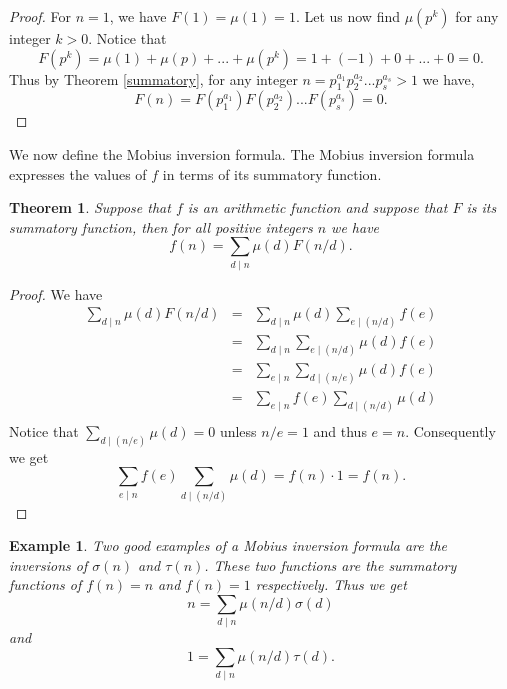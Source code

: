 \documentclass[12pt,letterpaper]{book}
\newtheorem{theorem}{Theorem}
\newtheorem{example}{Example}
\begin{document}
\begin{proof}
For $n=1$, we have $F(1)=\mu(1)=1$. Let us now find $\mu(p^k)$ for
any integer $k>0$.  Notice that
\begin{equation*}
F(p^k)=\mu(1)+\mu(p)+...+\mu(p^k)=1+(-1)+0+...+0=0.
\end{equation*}
Thus by Theorem \ref{summatory}, for any integer
$n=p_1^{a_1}p_2^{a_2}...p_s^{a_s}>1$ we have,
\begin{equation*}
F(n)=F(p_1^{a_1})F(p_2^{a_2})...F(p_s^{a_s})=0.
\end{equation*}
\end{proof}

We now define the Mobius inversion formula.  The Mobius inversion
formula expresses the values of $f$ in terms of its summatory
function. 
\begin{theorem}
Suppose that $f$ is an arithmetic function and suppose that $F$ is
its summatory function, then for all positive integers $n$ we have
\begin{equation*}
f(n)=\sum_{d\mid n}\mu(d)F(n/d).
\end{equation*}
\end{theorem}

\begin{proof}
We have
\begin{eqnarray*}
\sum_{d\mid n}\mu(d)F(n/d)&=&\sum_{d\mid n}\mu(d)\sum_{e\mid
(n/d)}f(e)\\ &=& \sum_{d\mid n}\sum_{e\mid
(n/d)}\mu(d)f(e)\\&=&\sum_{e\mid n}\sum_{d\mid
(n/e)}\mu(d)f(e)\\&=&\sum_{e\mid n}f(e)\sum_{d\mid
(n/d)}\mu(d)\\
\end{eqnarray*}
Notice that $\sum_{d\mid (n/e)}\mu(d)=0$ unless $n/e=1$ and thus
$e=n$.  Consequently we get
\begin{equation*}
\sum_{e\mid n}f(e)\sum_{d\mid (n/d)}\mu(d)=f(n)\cdot 1=f(n).
\end{equation*}
\end{proof}

\begin{example}
Two good examples of a Mobius inversion formula are the inversions
of $\sigma(n)$ and $\tau(n)$.  These two functions are the summatory
functions of $f(n)=n$ and $f(n)=1$ respectively. Thus we get
\begin{equation*}
n=\sum_{d\mid n}\mu(n/d)\sigma(d)
\end{equation*}
and
\begin{equation*}
1=\sum_{d\mid n}\mu(n/d)\tau(d).
\end{equation*}
\end{example}
\end{document}
